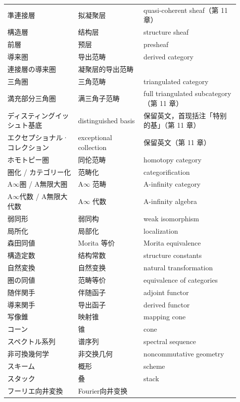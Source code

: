 \begin{longtable}{@{}>{\raggedright\arraybackslash}p{0.29\linewidth}>{\raggedright\arraybackslash}p{0.26\linewidth}>{\raggedright\arraybackslash}p{0.38\linewidth}@{}}
準連接層 & \mbox{拟凝聚层} & quasi-coherent sheaf（第 11 章） \\
構造層 & \mbox{结构层} & structure sheaf \\
前層 & \mbox{预层} & presheaf \\
導来圏 & \mbox{导出范畴} & derived category \\
連接層の導来圏 & \mbox{凝聚层的导出范畴} &  \\
三角圏 & \mbox{三角范畴} & triangulated category \\
満充部分三角圏 & \mbox{满三角子范畴} & full triangulated subcategory（第 11 章） \\
ディスティングイッシュト基底 & distinguished basis & 保留英文，首现括注「特别的基」（第 11 章） \\
エクセプショナル·コレクション & exceptional collection & 保留英文（第 11 章） \\
ホモトピー圏 & \mbox{同伦范畴} & homotopy category \\
圏化 / カテゴリー化 & \mbox{范畴化} & categorification \\
A$\infty$圏 / A無限大圏 & A$\infty$ \mbox{范畴} & A-infinity category \\
A$\infty$代数 / A無限大代数 & A$\infty$ \mbox{代数} & A-infinity algebra \\
弱同形 & \mbox{弱同构} & weak isomorphism \\
局所化 & \mbox{局部化} & localization \\
森田同値 & Morita \mbox{等价} & Morita equivalence \\
構造定数 & \mbox{结构常数} & structure constants \\
自然変換 & \mbox{自然变换} & natural transformation \\
圏の同値 & \mbox{范畴等价} & equivalence of categories \\
随伴関手 & \mbox{伴随函子} & adjoint functor \\
導来関手 & \mbox{导出函子} & derived functor \\
写像錐 & \mbox{映射锥} & mapping cone \\
コーン & \mbox{锥} & cone \\
スペクトル系列 & \mbox{谱序列} & spectral sequence \\
非可換幾何学 & \mbox{非交换几何} & noncommutative geometry \\
スキーム & \mbox{概形} & scheme \\
スタック & \mbox{叠} & stack \\
フーリエ\textendash{}向井変換 & \mbox{Fourier\textendash{}向井变换} &  \\

\end{longtable}
